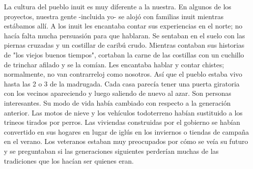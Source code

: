 \documentclass[twoside, 12pt]{book}
\begin{document}
La cultura del pueblo inuit es muy diferente a la nuestra. En algunos de los proyectos, nuestra gente -incluida yo- se alojó con familias inuit mientras estábamos allí. A los inuit les encantaba contar sus experiencias en el norte; no hacía falta mucha persuasión para que hablaran. Se sentaban en el suelo con las piernas cruzadas y un costillar de caribú crudo. Mientras contaban sus historias de "los viejos buenos tiempos", cortaban la carne de las costillas con un cuchillo de trinchar afilado y se la comían. Les encantaba hablar y contar chistes; normalmente, no van contrarreloj como nosotros. Así que el pueblo estaba vivo hasta las 2 o 3 de la madrugada. Cada casa parecía tener una puerta giratoria con los vecinos apareciendo y luego saliendo de nuevo al azar. Son personas interesantes. Su modo de vida había cambiado con respecto a la generación anterior. Las motos de nieve y los vehículos todoterreno habían sustituido a los trineos tirados por perros. Las viviendas construidas por el gobierno se habían convertido en sus hogares en lugar de iglús en los inviernos o tiendas de campaña en el verano. Los veteranos estaban muy preocupados por cómo se veía su futuro y se preguntaban si las generaciones siguientes perderían muchas de las tradiciones que los hacían ser quienes eran.\\
\end{document}
